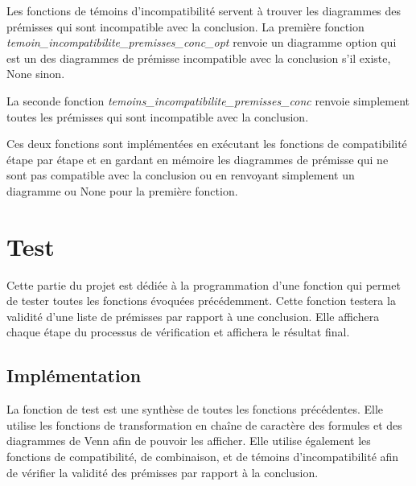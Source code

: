 \documentclass[12pt, letterpaper, french]{article}
\begin{document}
Les fonctions de témoins d'incompatibilité servent à trouver les diagrammes des
prémisses qui sont incompatible avec la conclusion. La première fonction
\emph{temoin\_incompatibilite\_premisses\_conc\_opt} renvoie un diagramme option
qui est un des diagrammes de prémisse incompatible avec la conclusion s'il existe, None sinon.

La seconde fonction \emph{temoins\_incompatibilite\_premisses\_conc} renvoie 
simplement toutes les prémisses qui sont incompatible avec la conclusion.

Ces deux fonctions sont implémentées en exécutant les fonctions de compatibilité
étape par étape et en gardant en mémoire les diagrammes de prémisse qui ne sont 
pas compatible avec la conclusion ou en renvoyant simplement un diagramme ou None pour la première fonction.

\section{Test}

Cette partie du projet est dédiée à la programmation d'une fonction qui permet 
de tester toutes les fonctions évoquées précédemment. Cette fonction testera 
la validité d'une liste de prémisses par rapport à une conclusion. Elle 
affichera chaque étape du processus de vérification et affichera le résultat 
final.

\subsection{Implémentation} 

La fonction de test est une synthèse de toutes les fonctions précédentes. Elle 
utilise les fonctions de transformation en chaîne de caractère des formules et 
des diagrammes de Venn afin de pouvoir les afficher. Elle utilise également les
fonctions de compatibilité, de combinaison, et de témoins d'incompatibilité afin
de vérifier la validité des prémisses par rapport à la conclusion.
\end{document}
